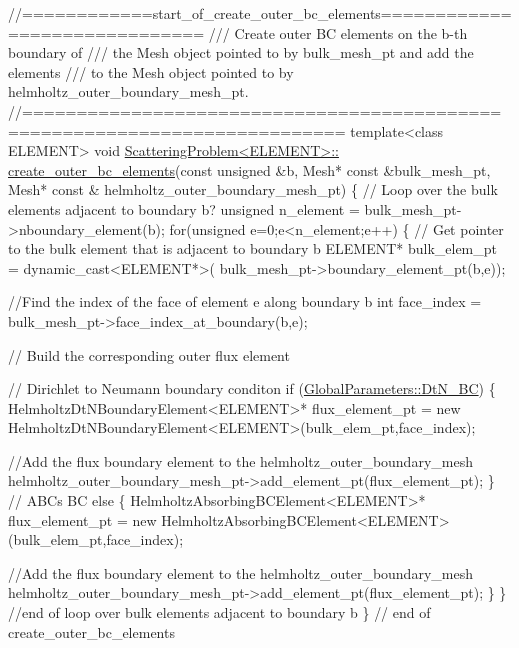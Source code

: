  
\begin{DoxyCodeInclude}
\textcolor{comment}{//============start\_of\_create\_outer\_bc\_elements==============================}
\textcolor{comment}{/// Create outer BC elements on the b-th boundary of }
\textcolor{comment}{}\textcolor{comment}{/// the Mesh object pointed to by bulk\_mesh\_pt and add the elements }
\textcolor{comment}{}\textcolor{comment}{/// to the Mesh object pointed to by helmholtz\_outer\_boundary\_mesh\_pt.}
\textcolor{comment}{}\textcolor{comment}{//===========================================================================}
\textcolor{keyword}{template}<\textcolor{keyword}{class} ELEMENT>
\textcolor{keywordtype}{void} \hyperlink{classScatteringProblem_a408e05fbe1f1456ab7013a7e8ab29ccc}{ScatteringProblem<ELEMENT>::}
\hyperlink{classScatteringProblem_a408e05fbe1f1456ab7013a7e8ab29ccc}{create\_outer\_bc\_elements}(\textcolor{keyword}{const} \textcolor{keywordtype}{unsigned} &b, Mesh* \textcolor{keyword}{const} &bulk\_mesh\_pt,
                         Mesh* \textcolor{keyword}{const} & helmholtz\_outer\_boundary\_mesh\_pt)
\{
 \textcolor{comment}{// Loop over the bulk elements adjacent to boundary b?}
 \textcolor{keywordtype}{unsigned} n\_element = bulk\_mesh\_pt->nboundary\_element(b);
 \textcolor{keywordflow}{for}(\textcolor{keywordtype}{unsigned} e=0;e<n\_element;e++)
  \{
   \textcolor{comment}{// Get pointer to the bulk element that is adjacent to boundary b}
   ELEMENT* bulk\_elem\_pt = \textcolor{keyword}{dynamic\_cast<}ELEMENT*\textcolor{keyword}{>}(
    bulk\_mesh\_pt->boundary\_element\_pt(b,e));
   
   \textcolor{comment}{//Find the index of the face of element e along boundary b }
   \textcolor{keywordtype}{int} face\_index = bulk\_mesh\_pt->face\_index\_at\_boundary(b,e);
   
   \textcolor{comment}{// Build the corresponding outer flux element}
   
   \textcolor{comment}{// Dirichlet to Neumann boundary conditon}
   \textcolor{keywordflow}{if} (\hyperlink{namespaceGlobalParameters_a6e2bba1769e86a5d3db88e2c7062bc63}{GlobalParameters::DtN\_BC})
    \{
     HelmholtzDtNBoundaryElement<ELEMENT>* flux\_element\_pt = \textcolor{keyword}{new} 
      HelmholtzDtNBoundaryElement<ELEMENT>(bulk\_elem\_pt,face\_index);
     
     \textcolor{comment}{//Add the flux boundary element to the  helmholtz\_outer\_boundary\_mesh}
     helmholtz\_outer\_boundary\_mesh\_pt->add\_element\_pt(flux\_element\_pt);
    \}
   \textcolor{comment}{//  ABCs BC}
   \textcolor{keywordflow}{else}
    \{
     HelmholtzAbsorbingBCElement<ELEMENT>* flux\_element\_pt = \textcolor{keyword}{new} 
      HelmholtzAbsorbingBCElement<ELEMENT>(bulk\_elem\_pt,face\_index);
     
     \textcolor{comment}{//Add the flux boundary element to the  helmholtz\_outer\_boundary\_mesh}
     helmholtz\_outer\_boundary\_mesh\_pt->add\_element\_pt(flux\_element\_pt);
    \}
  \} \textcolor{comment}{//end of loop over bulk elements adjacent to boundary b}
\} \textcolor{comment}{// end of create\_outer\_bc\_elements}

\end{DoxyCodeInclude}


